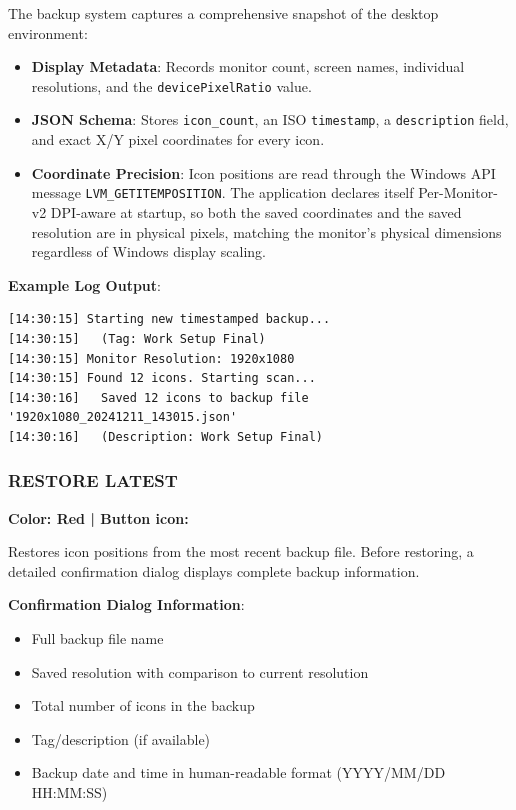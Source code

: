 \documentclass[a4paper,11pt]{article}
\begin{document}
\begin{infobox}
  The backup system captures a comprehensive snapshot of the desktop
  environment:
  \begin{itemize}
    \item \textbf{Display Metadata}: Records monitor count, screen names,
      individual resolutions, and the \texttt{devicePixelRatio} value.
    \item \textbf{JSON Schema}: Stores \texttt{icon\_count}, an ISO
      \texttt{timestamp}, a \texttt{description} field, and exact X/Y
      pixel coordinates for every icon.
    \item \textbf{Coordinate Precision}: Icon positions are read through
      the Windows API message \texttt{LVM\_GETITEMPOSITION}. The
      application declares itself Per-Monitor-v2 DPI-aware at startup,
      so both the saved coordinates and the saved resolution are in
      physical pixels, matching the monitor's physical dimensions
      regardless of Windows display scaling.
  \end{itemize}
\end{infobox}

\textbf{Example Log Output}:
\begin{verbatim}
[14:30:15] Starting new timestamped backup...
[14:30:15]   (Tag: Work Setup Final)
[14:30:15] Monitor Resolution: 1920x1080
[14:30:15] Found 12 icons. Starting scan...
[14:30:16]   Saved 12 icons to backup file '1920x1080_20241211_143015.json'
[14:30:16]   (Description: Work Setup Final)
\end{verbatim}

\subsubsection{RESTORE LATEST}

\textcolor{danger}{\textbf{Color: Red | Button icon: \faUndo}}

Restores icon positions from the most recent backup file. Before
restoring, a detailed confirmation dialog displays complete backup information.

\textbf{Confirmation Dialog Information}:
\begin{itemize}
  \item Full backup file name
  \item Saved resolution with comparison to current resolution
  \item Total number of icons in the backup
  \item Tag/description (if available)
  \item Backup date and time in human-readable format (YYYY/MM/DD HH:MM:SS)
\end{itemize}
\end{document}
